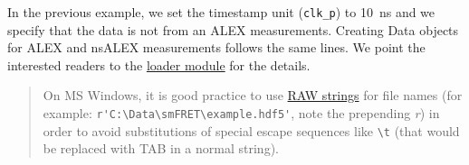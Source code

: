 In the previous example, we set the timestamp unit (\verb|clk_p|) to 10~ns and we specify that the data is not from an ALEX measurements. Creating Data objects for ALEX and nsALEX measurements follows the same lines. We point the interested readers to the \href{https://github.com/tritemio/FRETBursts/blob/master/fretbursts/loader.py}{loader module} for the details.

\begin{quote}
On MS Windows, it is good practice to use \href{https://docs.python.org/2/tutorial/introduction.html#strings}{RAW strings} for file names (for example: \verb|r'C:\Data\smFRET\example.hdf5'|, note the prepending \textit{r}) in order to avoid substitutions of special escape sequences like \verb|\t| (that would be replaced with TAB in a normal string).
\end{quote}